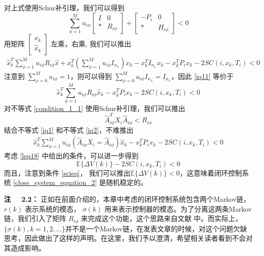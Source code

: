 	对上式使用Schur补引理，我们可以得到
	\begin{equation} \label{cons}
	\sum_{\phi=1}^{M}u_{i\phi} \begin{bmatrix}
	I&0\\
	*&R_{i\phi}
	\end{bmatrix} + \begin{bmatrix}
	-P_{i }&0\\
	*&H_{i\phi}
	\end{bmatrix} <0
	\end{equation}
	用矩阵 $\begin{bmatrix}
	x_k\\
	\hat{x}_{k}
	\end{bmatrix}$ 左乘，右乘, 我们可以推出
	\begin{equation} \label{iq11}
	\begin{split}
	\hat{x}^{T}_{k}\sum_{\phi=1}^{M}u_{i\phi}R_{i\phi}\hat{x}+x^{T}_{k}(\sum_{\phi=1}^{M}u_{i\phi}I_{n_x})x_{k}-x^{T}_{k}I_{n_x}x_{k} -x^{T}_{k}P_{i}x_{k}-2SC(i,x_k,T_i)<0
	\end{split}
	\end{equation}
	注意到 $\sum_{\phi=0}^{M}u_{i\phi}=1$，则可以得到 $\sum_{\phi=0}^{M}u_{i\phi}I_{n_x}=I_{n_x}$，因此 \eqref{iq11} 等价于
	\begin{equation} \label{iq1}
	\hat{x}^{T}_{k}\sum_{\phi=1}^{M}u_{i\phi}R_{i\phi}\hat{x}_k-x^{T}_{k}P_{i}x_{k}-2SC(i,x_k,T_i)<0
	\end{equation}
	对不等式 \eqref{condition_1_1} 使用Schur补引理，我们可以推出
	\begin{equation} \label{iq2}
	\hat{A}^{T}_{i\phi}X_{i}\hat{A}_{i\phi}<R_{i\phi}
	\end{equation}
	结合不等式 \eqref{iq1} 和不等式 \eqref{iq2}，不难推出
	\begin{equation} \label{leq22}
	\begin{split}
	\hat{x}^{T}_{k}\sum_{\phi=1}^{M} u_{i\phi}(\hat{A}_{i\phi}X_{i}=\hat{A}_{i\phi}) \hat{x}_{k} - x^{T}_{k}P_{i}x_{k} -2SC(i,x_k,T_i)<0
	\end{split}
	\end{equation}
	考虑 \eqref{leq18} 中给出的条件，可以进一步得到
	\begin{equation}
	\mathbb{E}\{\varDelta V(k)\}-2SC(i,x_k,T_i)<0
	\end{equation}
	而且，注意到条件 \eqref{scieq}， 我们可以推出$\mathbb{E}\{\varDelta V(k)\} <0$，这意味着闭环控制系统  \eqref{close_system_equation_2} 是随机稳定的。
	
	{\bf 注 \ \ 2.2：} 
	正如在前面介绍的，本章中考虑的闭环控制系统包含两个Markov链，$r(k)$ 表示系统的模态， $\sigma(k)$ 用来表示控制器的模态。为了分离这两条Markov链，我们引入了矩阵 $R_{i\phi}$ 来完成这个功能，这个思路来自文献 \cite{l2_filter_wu}中。而实际上， $\{\sigma(k), k=1,2,\dots\}$并不是一个Markov链，在发表文章的时候，对这个问题欠缺思考，因此做出了这样的声明。在这里，我们予以澄清，希望相关读者看到不会对其造成影响。 
	
